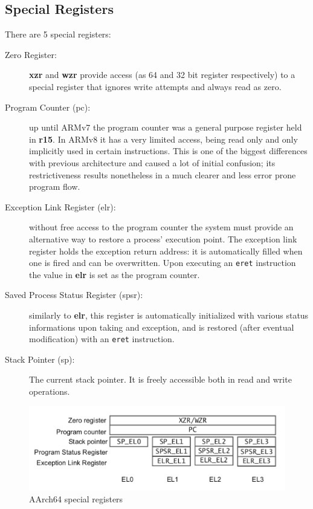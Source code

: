 \documentclass[12pt,a4paper,openright,twoside]{report}
\begin{document}
\subsection{Special Registers}
\label{spsr}
There are 5 special registers:
\begin{description}
    \item[Zero Register:] \textbf{xzr} and \textbf{wzr} provide access (as 64 and
        32 bit register respectively) to a special register that ignores write
        attempts and always read as zero.
    \item[Program Counter (pc):] up until ARMv7 the program counter was a general purpose
        register held in \textbf{r15}. In ARMv8 it has a very limited access,
        being read only and only implicitly used in certain instructions. This is 
        one of the biggest differences with previous architecture and caused a 
        lot of initial confusion; its restrictiveness results nonetheless in a
        much clearer and less error prone program flow.
    \item[Exception Link Register (elr):] without free access to the program counter
        the system must provide an alternative way to restore a process' execution
        point. The exception link register holds the exception return address: it 
        is automatically filled when one is fired and can be overwritten. Upon
        executing an {\tt eret} instruction the value in \textbf{elr} is set as the
        program counter.
    \item[Saved Process Status Register (spsr):] similarly to \textbf{elr}, this
        register is automatically initialized with various status informations
        upon taking and exception, and is restored (after eventual modification)
        with an {\tt eret} instruction.
    \item[Stack Pointer (sp):] The current stack pointer. It is freely accessible
        both in read and write operations.
\end{description}

\begin{figure}[t]
    \begin{center}
\includegraphics[scale=0.68]{images/tesi9.png}
\caption[special registers]{AArch64 special registers}\label{fig:specialreg}
    \end{center}
\end{figure}
\end{document}
